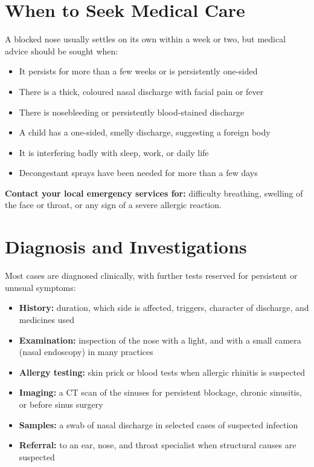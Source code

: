 \section*{When to Seek Medical Care}
A blocked nose usually settles on its own within a week or two, but medical advice should be sought when:

\begin{itemize}
    \item It persists for more than a few weeks or is persistently one-sided
    \item There is a thick, coloured nasal discharge with facial pain or fever
    \item There is nosebleeding or persistently blood-stained discharge
    \item A child has a one-sided, smelly discharge, suggesting a foreign body
    \item It is interfering badly with sleep, work, or daily life
    \item Decongestant sprays have been needed for more than a few days
\end{itemize}

\textbf{Contact your local emergency services for:} difficulty breathing, swelling of the face or throat, or any sign of a severe allergic reaction.

\section*{Diagnosis and Investigations}
Most cases are diagnosed clinically, with further tests reserved for persistent or unusual symptoms:

\begin{itemize}
    \item \textbf{History:} duration, which side is affected, triggers, character of discharge, and medicines used
    \item \textbf{Examination:} inspection of the nose with a light, and with a small camera (nasal endoscopy) in many practices
    \item \textbf{Allergy testing:} skin prick or blood tests when allergic rhinitis is suspected
    \item \textbf{Imaging:} a CT scan of the sinuses for persistent blockage, chronic sinusitis, or before sinus surgery
    \item \textbf{Samples:} a swab of nasal discharge in selected cases of suspected infection
    \item \textbf{Referral:} to an ear, nose, and throat specialist when structural causes are suspected
\end{itemize}

